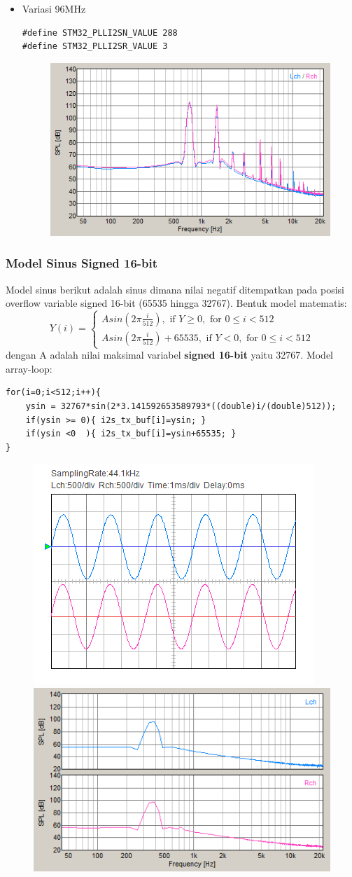 \documentclass[12pt,]{article}
\begin{document}
\begin{itemize}
  		\item Variasi 96MHz
  		\begin{verbatim}
#define STM32_PLLI2SN_VALUE 288
#define STM32_PLLI2SR_VALUE 3
  		\end{verbatim}
  		\begin{figure}[H]
  			\centering
  			\includegraphics[width=0.45\linewidth]{result/day_2/sine_clk96}
  		\end{figure}
  	\end{itemize}
  
  	\newpage
  	\subsubsection{Model Sinus Signed 16-bit}
  	Model sinus berikut adalah sinus dimana nilai negatif ditempatkan
  	pada posisi overflow variable signed 16-bit (65535 hingga 32767).
  	Bentuk model matematis:
  	\[
  	Y(i) = 
  	\begin{cases}
  	A sin(2 \pi \frac{i}{512}), \text{ if } Y \geq 0, \text{ for } 0 \leq i < 512\\ 
  	A sin(2 \pi \frac{i}{512})+65535, \text{ if } Y < 0, \text{ for } 0 \leq i < 512
  	\end{cases}
  	\]
  	dengan A adalah nilai maksimal variabel \textbf{signed 16-bit} yaitu 32767.
  	Model array-loop: 
  	\begin{verbatim}
for(i=0;i<512;i++){
  	ysin = 32767*sin(2*3.141592653589793*((double)i/(double)512));
  	if(ysin >= 0){ i2s_tx_buf[i]=ysin; }
  	if(ysin <0  ){ i2s_tx_buf[i]=ysin+65535; }
}
  	\end{verbatim}
  	\begin{figure}[H]
  		\centering
  		\includegraphics[width=0.45\linewidth]{result/day_4/newsine400}
  		\includegraphics[width=0.45\linewidth]{result/day_4/newsine400fft}
  	\end{figure}
  
\end{document}

